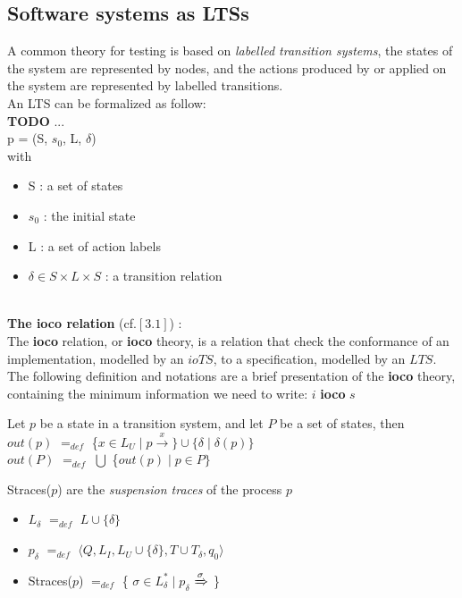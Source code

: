 \documentclass[a4paper]{report}
\begin{document}
\subsection*{Software systems as LTSs}
A common theory for testing is based on \textit{labelled transition systems}, the states of the system are represented by nodes, and the actions produced by or applied on the system are represented by labelled transitions.\\ An LTS can be formalized as follow:\\
{\color{red} \textbf{TODO}} ...\\
p = (S, $s_0$, L, $\delta$)\\
with 
\begin{itemize}
\item S : a set of states
\item $s_0$ : the initial state
\item L : a set of action labels
\item $\delta \in S \times L \times S$ : a transition relation
\end{itemize}
$ $\\
\newline
\textbf{The ioco relation} (cf.$[3.1]$) :\\
\newline
The \textbf{ioco} relation, or \textbf{ioco} theory, is a relation that check the conformance of an implementation, modelled by an $ioTS$, to a specification, modelled by an $LTS$. The following definition and notations are a brief presentation of the \textbf{ioco} theory, containing the minimum information we need to write: $i$ \textbf{ioco} $s$\\

\begin{definition}
Let $p$ be a state in a transition system, and let $P$ be a set of states, then\\
\newline
$out(p)$ $=_{def}$ \{$x\in L_U \mid p \xrightarrow{x} \} \cup \{ \delta \mid \delta (p) \}$\\
\newline
$out(P)$ $=_{def}$ $ \bigcup$ \{$out(p) \mid p \in P \}$\\
\end{definition}

\begin{definition}
Straces($p$) are the \textit{suspension traces} of the process $p$
\begin{itemize}
\item[] $L_{\delta}$ $=_{def}$ $L \cup \{\delta\}$
\item[] $p_{\delta}$ $=_{def}$ $\langle Q, L_I, L_U \cup \{\delta\}, T \cup T_{\delta}, q_0 \rangle$
\item[] Straces($p$) $=_{def}$ \{ $\sigma \in L_{\delta}^* \mid p_{\delta}$ $\xRightarrow{\sigma}$ \}
\end{itemize}

\end{definition}
\end{document}
